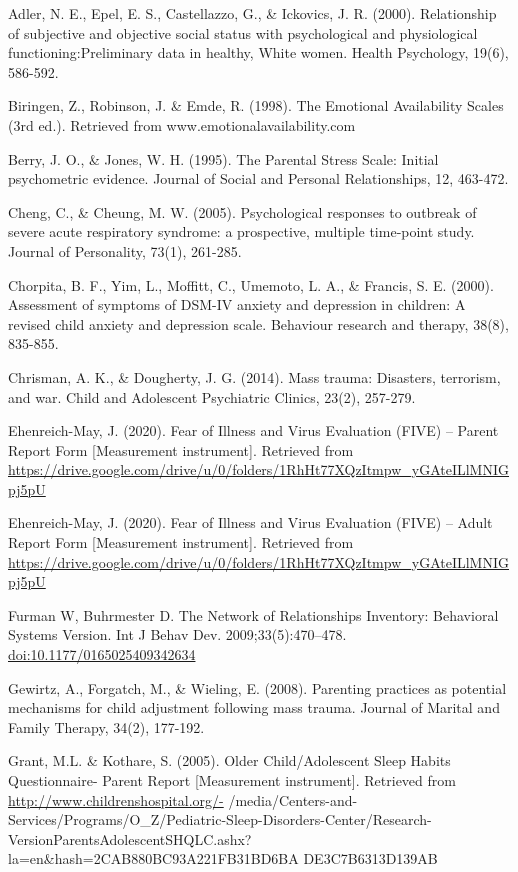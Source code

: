 \documentclass[]{book}
\begin{document}
Adler, N. E., Epel, E. S., Castellazzo, G., \& Ickovics, J. R. (2000).
Relationship of subjective and objective social status with psychological
and physiological functioning:Preliminary data in healthy, White women.
Health Psychology, 19(6), 586-592.

Biringen, Z., Robinson, J. \& Emde, R. (1998). The Emotional Availability
Scales (3rd ed.). Retrieved from www.emotionalavailability.com

Berry, J. O., \& Jones, W. H. (1995). The Parental Stress Scale: Initial
psychometric evidence. Journal of Social and Personal Relationships, 12,
463-472.

Cheng, C., \& Cheung, M. W. (2005). Psychological responses to outbreak of
severe acute respiratory syndrome: a prospective, multiple time‐point
study. Journal of Personality, 73(1), 261-285.

Chorpita, B. F., Yim, L., Moffitt, C., Umemoto, L. A., \& Francis, S. E. (2000). Assessment of
symptoms of DSM-IV anxiety and depression in children: A revised child anxiety and
depression scale. Behaviour research and therapy, 38(8), 835-855.

Chrisman, A. K., \& Dougherty, J. G. (2014). Mass trauma: Disasters, terrorism, and war. Child
and Adolescent Psychiatric Clinics, 23(2), 257-279.

Ehenreich-May, J. (2020). Fear of Illness and Virus Evaluation (FIVE) -- Parent Report Form
{[}Measurement instrument{]}. Retrieved from
\url{https://drive.google.com/drive/u/0/folders/1RhHt77XQzItmpw_yGAteILlMNIGpj5pU}

Ehenreich-May, J. (2020). Fear of Illness and Virus Evaluation (FIVE) -- Adult Report Form
{[}Measurement instrument{]}. Retrieved from
\url{https://drive.google.com/drive/u/0/folders/1RhHt77XQzItmpw_yGAteILlMNIGpj5pU}

Furman W, Buhrmester D. The Network of Relationships Inventory: Behavioral Systems
Version. Int J Behav Dev. 2009;33(5):470--478. \url{doi:10.1177/0165025409342634}

Gewirtz, A., Forgatch, M., \& Wieling, E. (2008). Parenting practices as potential mechanisms for
child adjustment following mass trauma. Journal of Marital and Family Therapy, 34(2),
177-192.

Grant, M.L. \& Kothare, S. (2005). Older Child/Adolescent Sleep Habits Questionnaire- Parent
Report {[}Measurement instrument{]}. Retrieved from \url{http://www.childrenshospital.org/-}
/media/Centers-and-Services/Programs/O\_Z/Pediatric-Sleep-Disorders-Center/Research-
VersionParentsAdolescentSHQLC.ashx?la=en\&hash=2CAB880BC93A221FB31BD6BA
DE3C7B6313D139AB
\end{document}
